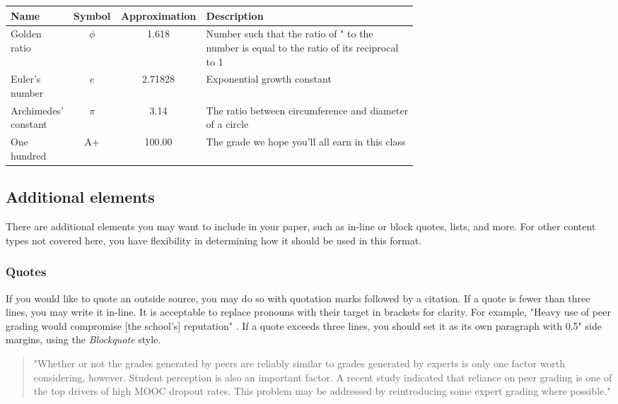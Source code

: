 \documentclass[
	letterpaper, %
]{jdf}
\begin{document}
\begin{jdftable}
\label{table:Example}
\small %
\begin{tabular}{@{} L{0.15\linewidth} c S L{0.52\linewidth}}
	\textbf{Name} & \textbf{Symbol} & \textbf{Approximation} & \textbf{Description} \\
	\toprule[0.5pt]
	Golden ratio & $\phi$ & 1.618 & Number such that the ratio of " to the number is equal to the ratio of its reciprocal to 1\\
	\midrule
	Euler's number & $e$ & 2.71828 & Exponential growth constant\\
	\midrule
	Archimedes' constant & $\pi$ & 3.14 & The ratio between circumference and diameter of a circle\\
	\midrule
	One hundred & A+ & 100.00 & The grade we hope you’ll all earn in this class\\
\end{tabular}
\end{jdftable}

\subsection{Additional elements}
There are additional elements you may want to include in your paper, such as in-line or block quotes, lists, and more. For other content types not covered here, 
you have flexibility in determining how it should be used in this format.

\subsubsection{Quotes}
If you would like to quote an outside source, you may do so with quotation marks followed by a citation. If a quote is fewer than three lines, you may write it 
in-line. It is acceptable to replace pronouns with their target in brackets for clarity. For example, "Heavy use of peer grading would compromise [the school’s] 
reputation" \citep{joyner2016}. If a quote exceeds three lines, you should set it as its own paragraph with 0.5" side margins, using the \emph{Blockquote} style.

\begin{quotation}
"Whether or not the grades generated by peers are reliably similar to grades generated by experts is only one factor worth considering, however. Student perception 
is also an important factor. A recent study indicated that reliance on peer grading is one of the top drivers of high MOOC dropout rates. This problem may be 
addressed by reintroducing some expert grading where possible." \citep{joyner2016}
\end{quotation}
\end{document}
